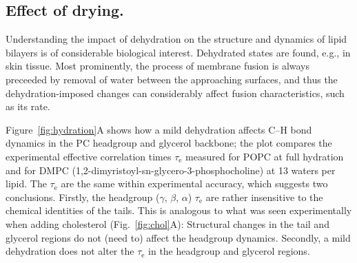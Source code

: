 \documentclass[journal=jcisd8,manuscript=article,layout=twocolumn]{achemso}
\begin{document}
\subsection*{Effect of drying.}
Understanding the impact of dehydration on the structure and dynamics of lipid bilayers is of considerable biological interest.
Dehydrated states are found, e.g., in skin tissue.
Most prominently, the process of membrane fusion is always preceeded by removal of water between the approaching surfaces, and thus the dehydration-imposed changes can considerably affect fusion characteristics, such as its rate.

Figure~\ref{fig:hydration}A shows how a mild dehydration affects
C--H bond dynamics in the PC headgroup and glycerol backbone;
the plot compares the experimental effective correlation times $\tau_\mathrm e$
measured for POPC at full hydration and for DMPC (1,2-dimyristoyl-sn-glycero-3-phosphocholine)
at 13 waters per lipid.
%
The $\tau_\mathrm e$ are the same within experimental accuracy, which suggests two conclusions. Firstly, 
the headgroup ($\gamma$, $\beta$, $\alpha$) $\tau_\mathrm e$ are rather insensitive to the chemical identities of the tails. This is analogous to  what was seen experimentally when adding cholesterol
(Fig.~\ref{fig:chol}A): Structural changes in the tail and glycerol regions do not (need to) affect the headgroup dynamics. Secondly, a mild dehydration does not alter the $\tau_\mathrm e$
in the headgroup and glycerol regions. 
\end{document}
